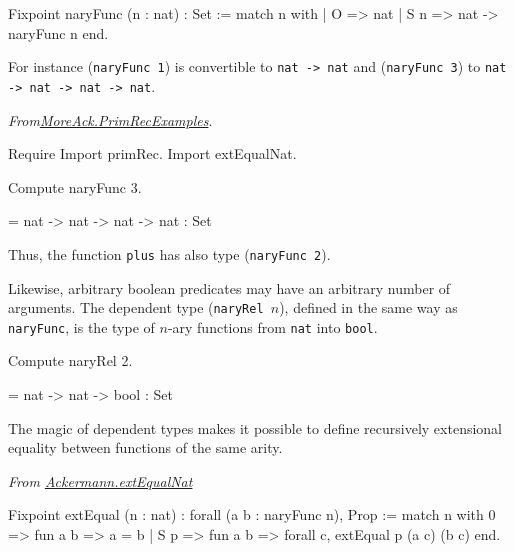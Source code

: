 \begin{Coqsrc}
Fixpoint naryFunc (n : nat) : Set :=
  match n with
  | O => nat
  | S n => nat -> naryFunc n
  end.
\end{Coqsrc}

For instance (\texttt{naryFunc 1}) is convertible to \texttt{nat -> nat} and (\texttt{naryFunc 3})
to \texttt{nat -> nat -> nat -> nat}.

\vspace{4pt}
\noindent
\emph{From\href{../theories/html/hydras.MoreAck.PrimRecExamples.html}{MoreAck.PrimRecExamples}}.
\begin{Coqsrc}
Require Import primRec.
Import extEqualNat.

Compute naryFunc 3.
\end{Coqsrc}

\begin{Coqanswer}
= nat -> nat -> nat -> nat
  : Set  
\end{Coqanswer}

Thus, the function \texttt{plus} has also type (\texttt{naryFunc 2}).

Likewise, arbitrary boolean predicates may have an arbitrary number of arguments. The dependent type
(\texttt{naryRel $n$}), defined in the same way as \texttt{naryFunc}, is the type of $n$-ary functions from
\texttt{nat} into \texttt{bool}.

\begin{Coqsrc}
Compute naryRel 2.
\end{Coqsrc}

\begin{Coqanswer}
 = nat -> nat -> bool
     : Set
\end{Coqanswer}

The magic of dependent types makes it possible to define recursively extensional equality between functions of the same arity.

\vspace{4pt}
\noindent
\emph{From \href{../theories/html/hydras.Ackermann.extEqualNat.html}{Ackermann.extEqualNat}}


\begin{Coqsrc}
Fixpoint  extEqual (n : nat) : forall  (a b : naryFunc n), Prop :=
  match n with
    0 => fun a b => a = b
  | S p => fun a b => forall c, extEqual p (a c) (b c)
  end.
\end{Coqsrc}

